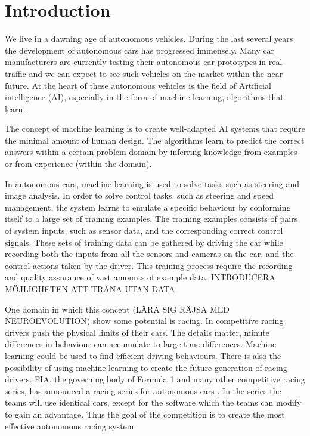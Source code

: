 \chapter{Introduction}


We live in a dawning age of autonomous vehicles. During the last several years the development of autonomous cars has progressed immensely. Many car manufacturers are currently testing their autonomous car prototypes in real traffic and we can expect to see such vehicles on the market within the near future. At the heart of these autonomous vehicles is the field of Artificial intelligence (AI), especially in the form of machine learning, algorithms that learn.

The concept of machine learning is to create well-adapted AI systems that require the minimal amount of human design. The algorithms learn to predict the correct answers within a certain problem domain by inferring knowledge from examples or from experience (within the domain). 

In autonomous cars, machine learning is used to solve tasks such as steering and image analysis. In order to solve control tasks, such as steering and speed management, the system learns to emulate a specific behaviour by conforming itself to a large set of training examples. The training examples consists of pairs of system inputs, such as sensor data, and the corresponding correct control signals. These sets of training data can be gathered by driving the car while recording both the inputs from all the sensors and cameras on the car, and the control actions taken by the driver. This training process require the recording and quality assurance of vast amounts of example data. INTRODUCERA MÖJLIGHETEN ATT TRÄNA UTAN DATA.


One domain in which this concept (LÄRA SIG RÄJSA MED NEUROEVOLUTION) show some potential is racing. In competitive racing drivers push the physical limits of their cars. The details matter, minute differences in behaviour can accumulate to large time differences. Machine learning could be used to find efficient driving behaviours. There is also the possibility of using machine learning to create the future generation of racing drivers. FIA, the governing body of Formula 1 and many other competitive racing series, has announced a racing series for autonomous cars \cite{roborace}. In the series the teams will use identical cars, except for the software which the teams can modify to gain an advantage. Thus the goal of the competition is to create the most effective autonomous racing system. 

